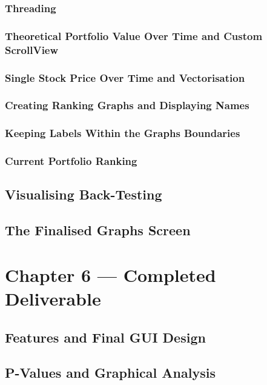 \documentclass{article}
\begin{document}
\subsubsection{Threading}

\subsubsection{Theoretical Portfolio Value Over Time and Custom ScrollView}

\subsubsection{Single Stock Price Over Time and Vectorisation}

\subsubsection{Creating Ranking Graphs and Displaying Names}

\subsubsection{Keeping Labels Within the Graphs Boundaries}

\subsubsection{Current Portfolio Ranking}

\subsection{Visualising Back-Testing}

\subsection{The Finalised Graphs Screen}


\section{Chapter 6 --- Completed Deliverable}

\subsection{Features and Final GUI Design}

\subsection{P-Values and Graphical Analysis}
\end{document}
